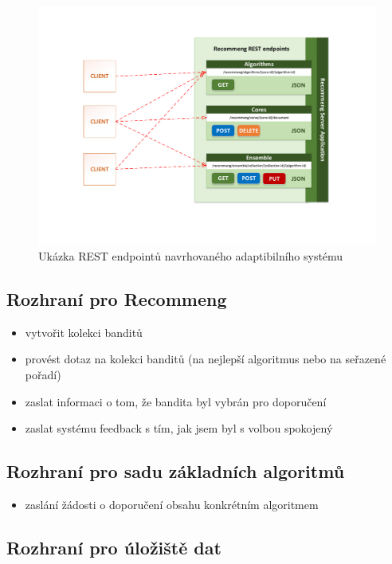 \documentclass[thesis=M,czech]{FITthesis}[2014/05/07]
\begin{document}
\begin{figure}\centering
	\includegraphics[width=1.0\textwidth]{obr/DIPLOMKA_rest.pdf}
 	\caption[Ukázka REST endpointů navrhovaného adaptibilního systému]{Ukázka REST endpointů navrhovaného adaptibilního systému}\label{fig:rest}
\end{figure}	

\subsection{Rozhraní pro Recommeng}

\begin{itemize}
	\item vytvořit kolekci banditů
	\item 	provést dotaz na kolekci banditů (na nejlepší algoritmus nebo na seřazené pořadí)
	\item 	zaslat informaci o tom, že bandita byl vybrán pro doporučení
	\item zaslat systému feedback s tím, jak jsem byl s volbou spokojený		
\end{itemize}

\subsection{Rozhraní pro sadu základních algoritmů}

\begin{itemize}
	\item zaslání žádosti o doporučení obsahu konkrétním algoritmem
\end{itemize}

\subsection{Rozhraní pro úložiště dat}
\end{document}
